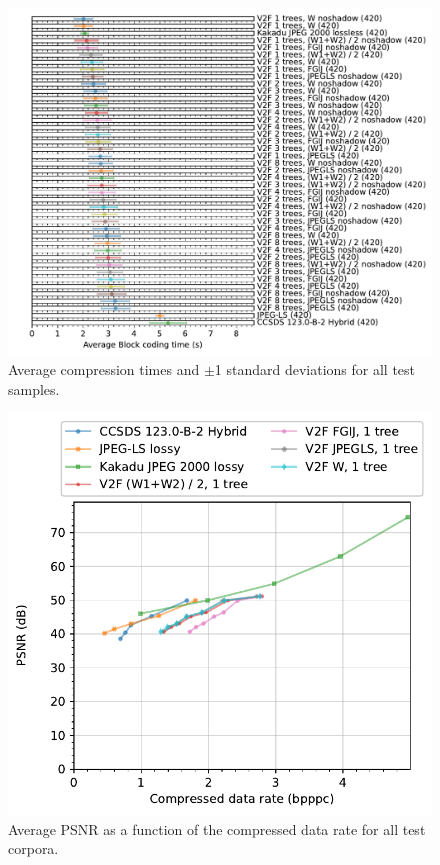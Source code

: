\documentclass{class/technicalReportUAB}
\begin{document}
\begin{figure}[h]
\begin{center}
\includegraphics[width=\linewidth]{./plots/lossless/ScalarNumericAnalyzer-block_coding_time_seconds-histogram-groupby__family_label.pdf}
\end{center}
\caption{Average compression times and $\pm$1 standard deviations for all test samples.}
\label{fig:lossless_time}
\end{figure}

\begin{figure}[h]
\begin{center}
\includegraphics[width=0.6\linewidth]{./plots/lossy/TwoNumericAnalyzer-columns_bpppc__psnr_dr-line-groupby__family_label.pdf}
\end{center}
\caption{Average PSNR as a function of the compressed data rate for all test corpora.}
\label{fig:lossy_psnr}
\end{figure}
\end{document}
